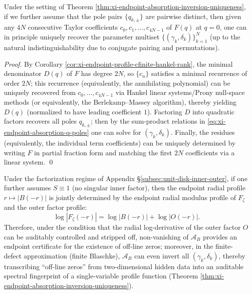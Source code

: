 \begin{corollary}\label{cor:xi-endpoint-profile-prony-invertibility}
Under the setting of Theorem \ref{thm:xi-endpoint-absorption-inversion-uniqueness}, if we further assume that the pole pairs \(\{q_{k,\pm}\}\) are pairwise distinct, then given any \(4N\) consecutive Taylor coefficients \(c_0,c_1,\dots,c_{4N-1}\) of \(F(q)\) at \(q=0\), one can in principle uniquely recover the parameter multiset \(\{(\gamma_k,\delta_k)\}_{k=1}^{N}\) (up to the natural indistinguishability due to conjugate pairing and permutations).
\end{corollary}
\begin{proof}
By Corollary \ref{cor:xi-endpoint-profile-cfinite-hankel-rank}, the minimal denominator \(D(q)\) of \(F\) has degree \(2N\), so \(\{c_n\}\) satisfies a minimal recurrence of order \(2N\); this recurrence (equivalently, the annihilating polynomial) can be uniquely recovered from \(c_0,\dots,c_{4N-1}\) via Hankel linear systems/Prony null-space methods (or equivalently, the Berlekamp--Massey algorithm), thereby yielding \(D(q)\) (normalized to have leading coefficient \(1\)).
Factoring \(D\) into quadratic factors recovers all poles \(q_{k,\pm}\); then by the sum-product relations in \eqref{eq:xi-endpoint-absorption-q-poles} one can solve for \((\gamma_k,\delta_k)\).
Finally, the residues (equivalently, the individual term coefficients) can be uniquely determined by writing \(F\) in partial fraction form and matching the first \(2N\) coefficients via a linear system. \qed
\end{proof}

\begin{corollary}\label{cor:xi-endpoint-tomography-certificate-chain}
Under the factorization regime of Appendix \S\ref{subsec:unit-disk-inner-outer}, if one further assumes \(S\equiv 1\) (no singular inner factor), then the endpoint radial profile \(r\mapsto |B(-r)|\) is jointly determined by the endpoint radial modulus profile of \(F_\zeta\) and the outer factor profile:
\[
\log|F_\zeta(-r)|=\log|B(-r)|+\log|O(-r)|.
\]
Therefore, under the condition that the radial log-derivative of the outer factor \(O\) can be auditably controlled and stripped off, non-vanishing of \(\mathcal{A}_B\) provides an endpoint certificate for the existence of off-line zeros; moreover, in the finite-defect approximation (finite Blaschke), \(\mathcal{A}_B\) can even invert all \((\gamma_k,\delta_k)\), thereby transcribing ``off-line zeros'' from two-dimensional hidden data into an auditable spectral fingerprint of a single-variable profile function (Theorem \ref{thm:xi-endpoint-absorption-inversion-uniqueness}).
\end{corollary}

\endinput
